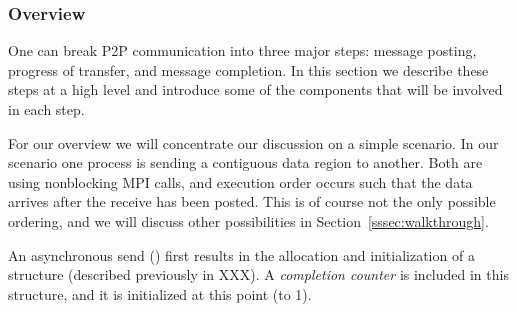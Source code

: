 \subsubsection{Overview}

% 
% 
% 

One can break P2P communication into three major steps: message
posting, progress of transfer, and message completion.  In this section we
describe these steps at a high level and introduce some of the components that
will be involved in each step.

% 

For our overview we will concentrate our discussion on a simple scenario.  In
our scenario one process is sending a contiguous data region to another.  Both
are using nonblocking MPI calls, and execution order occurs such that the data
arrives after the receive has been posted.  This is of course not the only
possible ordering, and we will discuss other possibilities in
Section~\ref{sssec:walkthrough}.

\begin{comment}
  \emph{include a figure showing the actual code snippets?}
\end{comment}


An asynchronous send () first results in the allocation and
initialization of a  structure (described previously in
XXX).  A \emph{completion counter} is included in this structure, and it is
initialized at this point (to 1).
%

\begin{comment}
  \emph{is it a MPI_Request structure or a MPID_Request structure?  are
  \texttt{MPI_Request}s just references to \texttt{MPID_Request}s?}
\end{comment}

